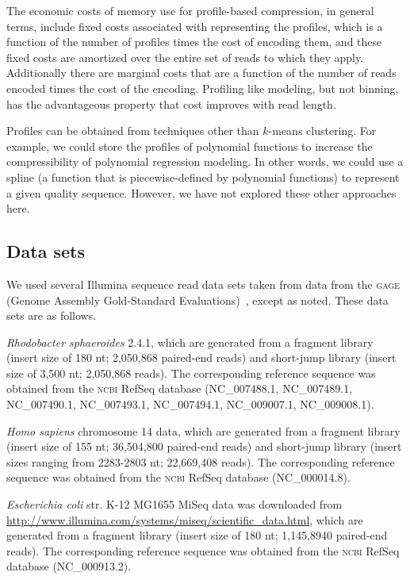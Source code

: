 \documentclass{bioinfo}
\begin{document}
\begin{methods}
The economic costs of memory use for profile-based compression, in
general terms, include fixed costs associated with representing the
profiles, which is a function of the number of profiles times the cost
of encoding them, and these fixed costs are amortized over the entire
set of reads to which they apply. Additionally there are marginal
costs that are a function of the number of reads encoded times the
cost of the encoding.  Profiling like modeling, but not binning, has
the advantageous property that cost improves with read length.

Profiles can be obtained from techniques other than $k$-means
clustering. For example, we could store the profiles of polynomial
functions to increase the compressibility of polynomial regression
modeling.  In other words, we could use a spline (a function that is
piecewise-defined by polynomial functions) to represent a given
quality sequence.  However, we have not explored these other
approaches here.

\subsection{Data sets}

We used several Illumina sequence read data sets taken from data from
the \textsc{gage} (Genome Assembly Gold-Standard
Evaluations)~\citep{Salzberg:2012rc}, except as noted. These data sets
are as follows.

\textit{Rhodobacter sphaeroides} 2.4.1, which are generated from a
fragment library (insert size of 180 nt; 2,050,868 paired-end reads)
and short-jump library (insert size of 3,500 nt; 2,050,868 reads). The
corresponding reference sequence was obtained from the \textsc{ncbi}
RefSeq database (NC\_007488.1, NC\_007489.1, NC\_007490.1,
NC\_007493.1, NC\_007494.1, NC\_009007.1, NC\_009008.1).

\textit{Homo sapiens} chromosome 14 data, which are generated from a
fragment library (insert size of 155 nt; 36,504,800 paired-end reads)
and short-jump library (insert sizes ranging from 2283-2803 nt;
22,669,408 reads). The corresponding reference sequence was obtained
from the \textsc{ncbi} RefSeq database (NC\_000014.8).

\textit{Escherichia coli} str. K-12 MG1655 MiSeq data was downloaded
from \url{http://www.illumina.com/systems/miseq/scientific_data.html},
which are generated from a fragment library (insert size of 180 nt;
1,145,8940 paired-end reads). The corresponding reference sequence was
obtained from the \textsc{ncbi} RefSeq database (NC\_000913.2).


\end{methods}
\end{document}
